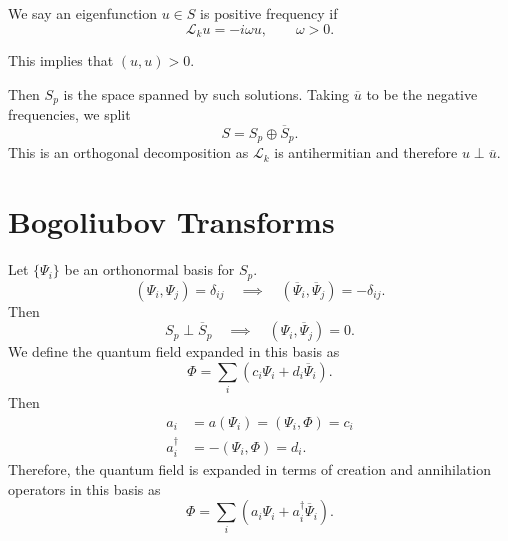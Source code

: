 \begin{definition}[]
  We say an eigenfunction $u \in S$ is positive frequency if 
  \begin{equation}
    \mathcal{L}_k u = -i \omega u, \qquad \omega > 0.
  \end{equation}
\end{definition}
\begin{exercise}[Sheet 4]
  This implies that $(u, u) > 0$.
\end{exercise}
Then $S_p$ is the space spanned by such solutions.
Taking $\overline{u}{}$ to be the negative frequencies, we split
\begin{equation}
  S = S_p \oplus \overline{S}{}_p.
\end{equation}
This is an orthogonal decomposition as $\mathcal{L}_k$ is antihermitian and therefore $u \perp \overline{u}{}$.

\section{Bogoliubov Transforms}%
\label{sec:bogoliubov_transforms}

Let $\{\Psi_i\}$ be an orthonormal basis for $S_p$.
\begin{equation}
  (\Psi_i, \Psi_j) = \delta_{ij} \quad \implies \quad (\overline{\Psi}{}_i, \overline{\Psi}{}_j) = -\delta_{ij}.
\end{equation}
Then 
\begin{equation}
  S_p \perp \overline{S}{}_p \quad \implies \quad (\Psi_i, \overline{\Psi}{}_j) = 0.
\end{equation}
We define the quantum field expanded in this basis as
\begin{equation}
  \Phi = \sum_i \left( c_{i} \Psi_{i} + d_i \overline{\Psi}{}_i \right).
\end{equation}
Then
\begin{align}
  a_i &= a(\Psi_i) = (\Psi_i, \Phi) = c_i \\
  a_i^{\dagger} &= - (\Psi_i, \Phi) = d_i.
\end{align}
Therefore, the quantum field is expanded in terms of creation and annihilation operators in this basis as
\begin{equation}
  \Phi = \sum_i \left( a_i \Psi_i + a_i^{\dagger} \overline{\Psi}{}_i \right).
\end{equation}

